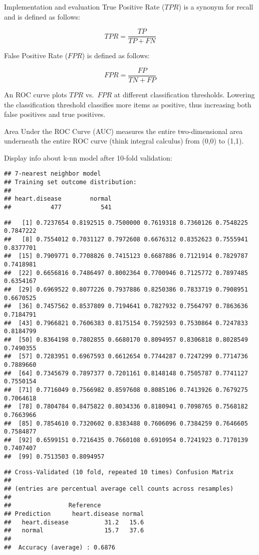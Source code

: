 \documentclass[
  ignorenonframetext,
]{beamer}
\begin{document}
\begin{frame}[fragile]{Implementation and evaluation}
True Positive Rate (\(TPR\)) is a synonym for recall and is defined as
follows:

\[ TPR = \frac{TP}{TP+FN}  \]

False Positive Rate (\(FPR\)) is defined as follows:

\[ FPR = \frac{FP}{TN+FP}  \]

An ROC curve plots \(TPR\) vs.~\(FPR\) at different classification
thresholds. Lowering the classification threshold classifies more items
as positive, thus increasing both false positives and true positives.

Area Under the ROC Curve (AUC) measures the entire two-dimensional area
underneath the entire ROC curve (think integral calculus) from (0,0) to
(1,1).

Display info about k-nn model after 10-fold validation:

\begin{verbatim}
## 7-nearest neighbor model
## Training set outcome distribution:
## 
## heart.disease        normal 
##           477           541
\end{verbatim}

\begin{verbatim}
##   [1] 0.7237654 0.8192515 0.7500000 0.7619318 0.7360126 0.7548225 0.7847222
##   [8] 0.7554012 0.7031127 0.7972608 0.6676312 0.8352623 0.7555941 0.8377701
##  [15] 0.7909771 0.7708826 0.7415123 0.6687886 0.7121914 0.7829787 0.7418981
##  [22] 0.6656816 0.7486497 0.8002364 0.7700946 0.7125772 0.7897485 0.6354167
##  [29] 0.6969522 0.8077226 0.7937886 0.8250386 0.7833719 0.7908951 0.6670525
##  [36] 0.7457562 0.8537809 0.7194641 0.7827932 0.7564797 0.7863636 0.7184791
##  [43] 0.7966821 0.7606383 0.8175154 0.7592593 0.7530864 0.7247833 0.8184799
##  [50] 0.8364198 0.7802855 0.6680170 0.8094957 0.8306818 0.8028549 0.7490355
##  [57] 0.7283951 0.6967593 0.6612654 0.7744287 0.7247299 0.7714736 0.7889660
##  [64] 0.7345679 0.7897377 0.7201161 0.8148148 0.7505787 0.7741127 0.7550154
##  [71] 0.7716049 0.7566982 0.8597608 0.8085106 0.7413926 0.7679275 0.7064618
##  [78] 0.7804784 0.8475822 0.8034336 0.8180941 0.7098765 0.7568182 0.7663966
##  [85] 0.7854610 0.7320602 0.8383488 0.7606096 0.7384259 0.7646605 0.7584877
##  [92] 0.6599151 0.7216435 0.7660108 0.6910954 0.7241923 0.7170139 0.7407407
##  [99] 0.7513503 0.8094957
\end{verbatim}

\begin{verbatim}
## Cross-Validated (10 fold, repeated 10 times) Confusion Matrix 
## 
## (entries are percentual average cell counts across resamples)
##  
##                Reference
## Prediction      heart.disease normal
##   heart.disease          31.2   15.6
##   normal                 15.7   37.6
##                             
##  Accuracy (average) : 0.6876
\end{verbatim}


\end{frame}
\end{document}
